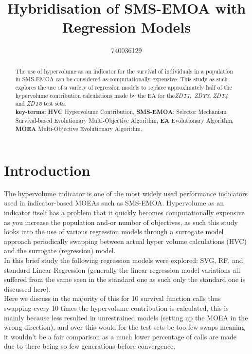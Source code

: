 \documentclass[sigconf,review,nonacm]{acmart}
\begin{document}
\title[Hybrid SMS-EMOA]{Hybridisation of SMS-EMOA with Regression Models}
\author{740036129}

\begin{abstract}

The use of hypervolume as an indicator for the survival of individuals in a population in SMS-EMOA can be considered as computationally expensive. This study as such explores the use of a variety of regression models to replace approximately half of the hypervolume contribution calculations made by the EA for the\textit{ZDT1},\ \textit{ZDT3}, \textit{ZDT4} and \textit{ZDT6} test sets. \\
 \textbf{key-terms:}
    \textbf{HVC} Hypervolume Contribution,
    \textbf{SMS-EMOA}: Selector Mechanism Survival-based Evolutionary Multi-Objective Algorithm,
    \textbf{EA} Evolutionary Algorithm,
    \textbf{MOEA} Multi-Objective Evolutionary Algorithm.
\end{abstract}

\maketitle

\section{Introduction}

The hypervolume indicator is one of the most widely used performance indicators used in indicator-based MOEAs such as SMS-EMOA. Hypervolume as an indicator itself has a problem that it quickly becomes computationally expensive as you increase the population and-or number of objectives, as such this study looks into the use of various regression models through a surrogate model approach periodically swapping between actual hyper volume calculations (HVC) and the surrogate (regression) model.  \\

\noindent In this brief study the following regression models were explored: SVG, RF, and standard Linear Regression (generally the linear regression model variations all suffered from the same seen in the standard one as such only the standard one is discussed here). \\

\noindent Here we discuss in the majority of this for 10 survival function calls thus swapping every 10 times the hypervolume contribution is calculated, this is mainly because less resulted in unrestrained models (setting up the MOEA in the wrong direction), and over this would for the test sets be too few swaps meaning it wouldn't be a fair comparison as a much lower percentage of calls are made due to there being so few generations before convergence.  \\
\end{document}

